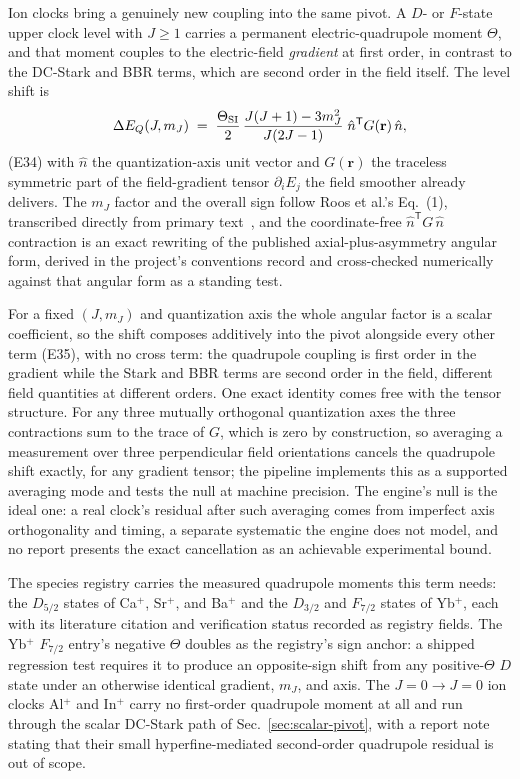 \documentclass[aps,pra,superscriptaddress,groupedaddress,nofootinbib]{revtex4-2}
\begin{document}
Ion clocks bring a genuinely new coupling into the same pivot. A $D$-
or $F$-state upper clock level with $J\ge1$ carries a permanent
electric-quadrupole moment $\Theta$, and that moment couples to the
electric-field \emph{gradient} at first order, in contrast to the
DC-Stark and BBR terms, which are second order in the field itself.
The level shift is
\begin{equation}
  \Delta E_Q(J, m_J) \;=\; \frac{\Theta_{\rm SI}}{2}\,
  \frac{J(J+1)-3m_J^2}{J(2J-1)}\;
  \hat n^{\mathsf T} G(\mathbf{r})\,\hat n ,
  \label{eq:e34}
\end{equation}
(E34) with $\hat n$ the quantization-axis unit vector and
$G(\mathbf{r})$ the traceless symmetric part of the field-gradient
tensor $\partial_i E_j$ the field smoother already delivers. The $m_J$
factor and the overall sign follow Roos et al.'s Eq.~(1), transcribed
directly from primary text~\cite{Roos2006}, and the coordinate-free
$\hat n^{\mathsf T} G\,\hat n$ contraction is an exact rewriting of the
published axial-plus-asymmetry angular form, derived in the project's
conventions record and cross-checked numerically against that angular
form as a standing test.

For a fixed $(J, m_J)$ and quantization axis the whole angular factor
is a scalar coefficient, so the shift composes additively into the
pivot alongside every other term (E35), with no cross term: the
quadrupole coupling is first order in the gradient while the Stark and
BBR terms are second order in the field, different field quantities at
different orders. One exact identity comes free with the tensor
structure. For any three mutually orthogonal quantization axes the
three contractions sum to the trace of $G$, which is zero by
construction, so averaging a measurement over three perpendicular field
orientations cancels the quadrupole shift exactly, for any gradient
tensor; the pipeline implements this as a supported averaging mode and
tests the null at machine precision. The engine's null is the ideal
one: a real clock's residual after such averaging comes from imperfect
axis orthogonality and timing, a separate systematic the engine does
not model, and no report presents the exact cancellation as an
achievable experimental bound.

The species registry carries the measured quadrupole moments this term
needs: the $D_{5/2}$ states of Ca$^+$, Sr$^+$, and Ba$^+$ and the
$D_{3/2}$ and $F_{7/2}$ states of Yb$^+$, each with its literature
citation and verification status recorded as registry fields. The
Yb$^+$ $F_{7/2}$ entry's negative $\Theta$ doubles as the registry's
sign anchor: a shipped regression test requires it to produce an
opposite-sign shift from any positive-$\Theta$ $D$ state under an
otherwise identical gradient, $m_J$, and axis. The
$J{=}0\!\to\!J{=}0$ ion clocks Al$^+$ and In$^+$ carry no first-order
quadrupole moment at all and run through the scalar DC-Stark path of
Sec.~\ref{sec:scalar-pivot}, with a report note stating that their
small hyperfine-mediated second-order quadrupole residual is out of
scope.
\end{document}
